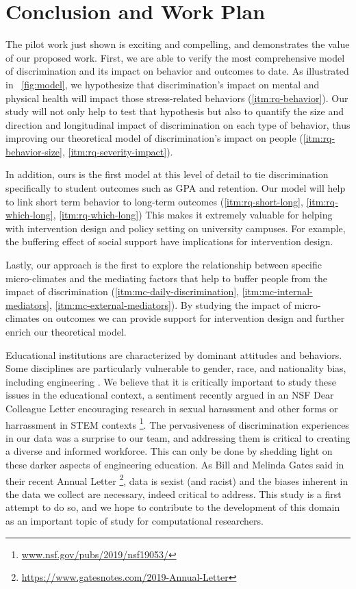 \section{Conclusion and Work Plan}
\label{sec:conclusion}
The pilot work just shown is exciting and compelling, and demonstrates the value of our proposed work. First,
 we are able to verify the most comprehensive model of discrimination and its impact on behavior and outcomes to date.
 As illustrated in ~\ref{fig:model}, we hypothesize that discrimination's impact on mental and physical health will  impact those stress-related behaviors (\ref{itm:rq-behavior}). Our study will not only help to test that hypothesis but also to quantify the size and direction and longitudinal impact of discrimination on each type of behavior, thus improving our theoretical model of discrimination's impact on people (\ref{itm:rq-behavior-size}, \ref{itm:rq-severity-impact}).
 
 In addition, ours is the first model at this level of detail to tie discrimination specifically to student outcomes such as GPA and retention. Our model will help to link short term behavior to long-term outcomes (\ref{itm:rq-short-long}, \ref{itm:rq-which-long}, \ref{itm:rq-which-long}) This makes it extremely valuable for helping with intervention design and policy setting on university campuses.
 For example, the buffering effect of social support have implications for intervention design. 

Lastly, our approach is the first to explore the relationship between specific micro-climates and the mediating factors that help to buffer people from the impact of discrimination (\ref{itm:mc-daily-discrimination}, \ref{itm:mc-internal-mediators}, \ref{itm:mc-external-mediators}). By studying the impact of micro-climates on outcomes we can provide support for intervention design and further enrich our theoretical model. 

Educational institutions are characterized by dominant attitudes and behaviors. Some disciplines are particularly vulnerable to gender, race, and nationality bias, including  engineering \cite{sevo2010bias}.  We believe that it is critically important to study these issues in the educational context, a sentiment recently argued in an NSF Dear Colleague Letter encouraging research in sexual harassment and other forms or harrassment in STEM contexts \footnote{\url{www.nsf.gov/pubs/2019/nsf19053/}}. The pervasiveness of discrimination experiences in our data was a surprise to our team, and addressing them is critical to creating a diverse and informed workforce. This can only be done by shedding light on these darker aspects of engineering education. 
As Bill and Melinda Gates said in their  recent Annual Letter \footnote{\url{https://www.gatesnotes.com/2019-Annual-Letter}}, data is sexist (and racist) and the biases inherent in the data we collect are necessary, indeed critical to address. This study is a first attempt to do so, and we hope to contribute to the development of this domain as an important topic of study for computational researchers.   

